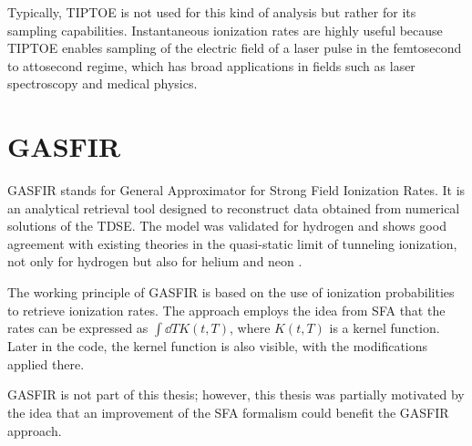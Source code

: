Typically, TIPTOE is not used for this kind of analysis but rather for its sampling capabilities.
Instantaneous ionization rates are highly useful because TIPTOE enables sampling of the electric field of a laser pulse in the femtosecond to attosecond regime, which has broad applications in fields such as laser spectroscopy and medical physics.






\section{GASFIR}
GASFIR stands for General Approximator for Strong Field Ionization Rates.
It is an analytical retrieval tool designed to reconstruct data obtained from numerical solutions of the TDSE.
The model was validated for hydrogen and shows good agreement with existing theories in the quasi-static limit of tunneling ionization, not only for hydrogen but also for helium and neon \cite{agarwal2025generalapproximatorstrongfieldionization}.

The working principle of GASFIR is based on the use of ionization probabilities to retrieve ionization rates.
The approach employs the idea from SFA that the rates can be expressed as $\int \dd T K(t,T)$, where $K(t,T)$ is a kernel function.
Later in the code, the kernel function is also visible, with the modifications applied there.

GASFIR is not part of this thesis; however, this thesis was partially motivated by the idea that an improvement of the SFA formalism could benefit the GASFIR approach.


